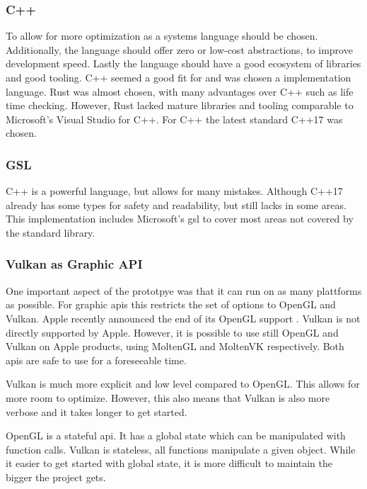 \subsubsection{C++}
To allow for more optimization as a systems language should be chosen. Additionally, the language should offer zero or low-cost abstractions, to improve development speed. Lastly the language should have a good ecosystem of libraries and good tooling. C++ seemed a good fit for and was chosen a implementation language. Rust \cite{rustlang} was almost chosen, with many advantages over C++ such as life time checking. However, Rust lacked mature libraries and tooling comparable to Microsoft's Visual Studio \cite{microsoft:visualstudio} for C++. For C++ the latest standard C++17 was chosen.

\subsubsection{GSL}
C++ is a powerful language, but allows for many mistakes. Although C++17 already has some types for safety and readability, but still lacks in some areas. This implementation includes Microsoft's \gls{gsl} \cite{microsoft:gsl} to cover most areas not covered by the standard library.


\subsubsection{Vulkan as Graphic API}
One important aspect of the prototpye was that it can run on as many plattforms as possible. %
For graphic \glspl{api} this restricts the set of options to OpenGL and Vulkan. Apple recently announced the end of its OpenGL support \cite{arstechnica:openGL}. Vulkan is not directly supported by Apple. However, it is possible to use still OpenGL and Vulkan on Apple products, using MoltenGL \cite{moltenGL} and MoltenVK \cite{moltenVK} respectively. Both \glspl{api} are safe to use for a foreseeable time.

Vulkan is much more explicit and low level compared to OpenGL. This allows for more room to optimize. However, this also means that Vulkan is also more verbose and it takes longer to get started.

OpenGL is a stateful \gls{api}. It has a global state which can be manipulated with function calls. Vulkan is stateless, all functions manipulate a given object. While it easier to get started with global state, it is more difficult to maintain the bigger the project gets.

